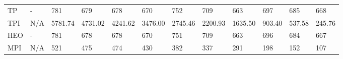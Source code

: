 \begin{table*}
{\begin{tabular}{llllllllllll}
TP       &              - &                781 &                679 &                678 &                670 &                752 &                709 &                663 &               697 &                685 &                668 \\
TPI      &            N/A &            5781.74 &            4731.02 &            4241.62 &            3476.00 &            2745.46 &            2200.93 &            1635.50 &            903.40 &             537.58 &             245.76 \\
HEO      &              - &                781 &                678 &                678 &                670 &                751 &                709 &                663 &               696 &                684 &                667 \\
MPI      &            N/A &                521 &                475 &                474 &                430 &                382 &                337 &                291 &               198 &                152 &                107 \\
\bottomrule
\end{tabular}}
\end{table*}



